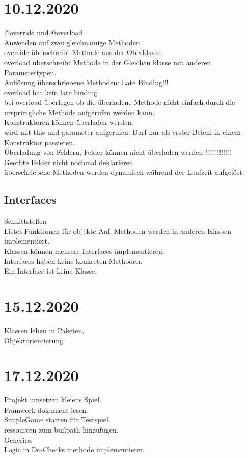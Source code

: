 \documentclass{article}
\begin{document}
	\section*{10.12.2020}
	@override und @overload \\
	Anwenden auf zwei gleichnamige Methoden \\
	override überschreibt Methode aus der Oberklasse. \\
	overload überschreibt Methode in der Gleichen klasse mit anderen Parametertypen. \\
	Auflösung überschriebene Methoden: Late Binding!!! \\
	overload hat kein late binding \\
	bei overload überlegen ob die überladene Methode nicht einfach durch die ursprüngliche Methode aufgerufen werden kann. \\
	Konstruktoren können überladen werden. \\
	wird mit this und parameter aufgerufen. Darf nur als erster Befehl in einem Konstruktor passieren. \\
	Überladung von Feldern, Felder können nicht überladen werden !!!!!!!!!!!!! \\
	Geerbte Felder nicht nochmal deklarieren. \\
	überschriebene Methoden werden dynamisch während der Laufzeit aufgelöst. \\
	\subsection*{Interfaces}
	Schnittstellen \\
	Listet Funktionen für objekte Auf. Methoden werden in anderen Klassen implementiert. \\
	Klassen können mehrere Interfaces implementieren. \\
	Interfaces haben keine konkreten Methoden. \\
	Ein Interface ist keine Klasse. \\
	\section*{15.12.2020}
	Klassen leben in Paketen. \\
	Objektorientierung  \\
	\section*{17.12.2020}
	Projekt umsetzen kleiens Spiel. \\
	Framwork dokument lesen. \\
	SimpleGame starten für Testspiel. \\
	ressourcen zum builpath hinzufügen. \\
	Generics. \\
	Logic in Do-Checks methode implementieren. \\
\end{document}
